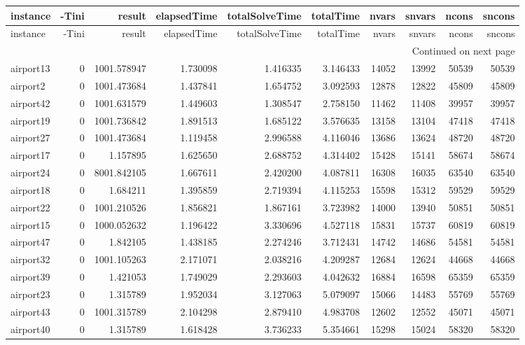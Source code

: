\begin{longtable}{|l|r|r|r|r|r|r|r|r|r|}
\toprule
instance & -Tini & result & elapsedTime & totalSolveTime & totalTime & nvars & snvars & ncons & sncons \\
\midrule
\endfirsthead
\toprule
instance & -Tini & result & elapsedTime & totalSolveTime & totalTime & nvars & snvars & ncons & sncons \\
\midrule
\endhead
\midrule
\multicolumn{10}{r}{Continued on next page} \\
\midrule
\endfoot
\bottomrule
\endlastfoot
airport13 & 0 & 1001.578947 & 1.730098 & 1.416335 & 3.146433 & 14052 & 13992 & 50539 & 50539 \\
airport2 & 0 & 1001.473684 & 1.437841 & 1.654752 & 3.092593 & 12878 & 12822 & 45809 & 45809 \\
airport42 & 0 & 1001.631579 & 1.449603 & 1.308547 & 2.758150 & 11462 & 11408 & 39957 & 39957 \\
airport19 & 0 & 1001.736842 & 1.891513 & 1.685122 & 3.576635 & 13158 & 13104 & 47418 & 47418 \\
airport27 & 0 & 1001.473684 & 1.119458 & 2.996588 & 4.116046 & 13686 & 13624 & 48720 & 48720 \\
airport17 & 0 & 1.157895 & 1.625650 & 2.688752 & 4.314402 & 15428 & 15141 & 58674 & 58674 \\
airport24 & 0 & 8001.842105 & 1.667611 & 2.420200 & 4.087811 & 16308 & 16035 & 63540 & 63540 \\
airport18 & 0 & 1.684211 & 1.395859 & 2.719394 & 4.115253 & 15598 & 15312 & 59529 & 59529 \\
airport22 & 0 & 1001.210526 & 1.856821 & 1.867161 & 3.723982 & 14000 & 13940 & 50851 & 50851 \\
airport15 & 0 & 1000.052632 & 1.196422 & 3.330696 & 4.527118 & 15831 & 15737 & 60819 & 60819 \\
airport47 & 0 & 1.842105 & 1.438185 & 2.274246 & 3.712431 & 14742 & 14686 & 54581 & 54581 \\
airport32 & 0 & 1001.105263 & 2.171071 & 2.038216 & 4.209287 & 12684 & 12624 & 44668 & 44668 \\
airport39 & 0 & 1.421053 & 1.749029 & 2.293603 & 4.042632 & 16884 & 16598 & 65359 & 65359 \\
airport23 & 0 & 1.315789 & 1.952034 & 3.127063 & 5.079097 & 15066 & 14483 & 55769 & 55769 \\
airport43 & 0 & 1001.315789 & 2.104298 & 2.879410 & 4.983708 & 12602 & 12552 & 45071 & 45071 \\
airport40 & 0 & 1.315789 & 1.618428 & 3.736233 & 5.354661 & 15298 & 15024 & 58320 & 58320 \\

\end{longtable}
